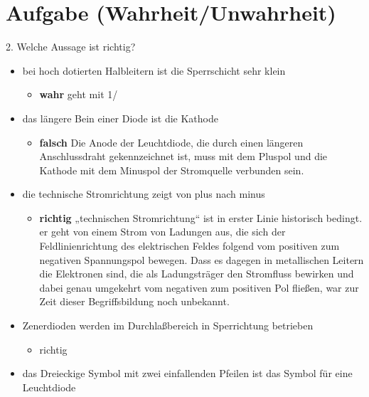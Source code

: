 \section{Aufgabe (Wahrheit/Unwahrheit)}%
\label{sec:aufgabe_1}

2. Welche Aussage ist richtig?

\begin{itemize}
    \item bei hoch dotierten Halbleitern ist die Sperrschicht sehr klein
        \begin{itemize}
            \item \textbf{wahr} geht mit 1/
        \end{itemize}
    \item das längere Bein einer Diode ist die Kathode 
        \begin{itemize}
            \item \textbf{falsch} Die Anode der Leuchtdiode,
                die durch einen längeren Anschlussdraht gekennzeichnet ist, 
                muss mit dem Pluspol 
                und die Kathode mit dem Minuspol der Stromquelle 
                verbunden sein. 
        \end{itemize}
    \item die technische Stromrichtung zeigt von plus nach minus
        \begin{itemize}
            \item \textbf{richtig} „technischen Stromrichtung“ ist in erster 
                Linie historisch bedingt. 
                er geht von einem Strom von Ladungen aus, 
                die sich der Feldlinienrichtung des elektrischen Feldes folgend
                vom positiven zum negativen Spannungspol bewegen. 
                Dass es dagegen in metallischen Leitern die Elektronen sind, 
                die als Ladungsträger den Stromfluss bewirken 
                und dabei genau umgekehrt vom negativen zum positiven Pol 
                fließen, war zur Zeit dieser Begriffsbildung noch unbekannt.
        \end{itemize}
    \item Zenerdioden werden im Durchlaßbereich in Sperrichtung betrieben
        \begin{itemize}
            \item richtig 
        \end{itemize}
    \item das Dreieckige Symbol mit zwei einfallenden Pfeilen ist das Symbol für
        eine Leuchtdiode

\end{itemize}
